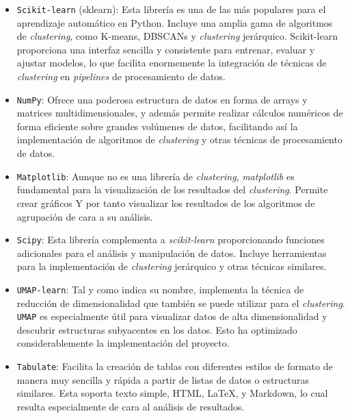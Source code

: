 \begin{itemize}
\item \texttt{Scikit-learn} (sklearn)\label{scikit}: Esta librería es una de las más populares para el aprendizaje automático en Python. Incluye una amplia gama de algoritmos de \textit{clustering}, como K-means, \glspl{DBSCAN} y \textit{clustering} jerárquico. Scikit-learn proporciona una interfaz sencilla y consistente para entrenar, evaluar y ajustar modelos, lo que facilita enormemente la integración de técnicas de \textit{clustering} en \textit{pipelines} de procesamiento de datos. \\
\item \texttt{NumPy}: Ofrece una poderosa estructura de datos en forma de arrays y matrices multidimensionales, y además permite realizar cálculos numéricos de forma eficiente sobre grandes volúmenes de datos, facilitando así la implementación de algoritmos de \textit{clustering} y otras técnicas de procesamiento de datos. \\
\item \texttt{Matplotlib}: Aunque no es una librería de \textit{clustering}, \textit{matplotlib} es fundamental para la visualización de los resultados del \textit{clustering}. Permite crear gráficos Y por tanto visualizar los resultados de los algoritmos de agrupación de cara a su análisis. \\
\item \texttt{Scipy}: Esta librería complementa a \textit{scikit-learn} proporcionando funciones adicionales para el análisis y manipulación de datos. Incluye herramientas para la implementación de \textit{clustering} jerárquico y otras técnicas similares. \\
\item \texttt{\gls{UMAP}-learn}: Tal y como indica su nombre, implementa la técnica de reducción de dimensionalidad que también se puede utilizar para el \textit{clustering}. \texttt{\gls{UMAP}} es especialmente útil para visualizar datos de alta dimensionalidad y descubrir estructuras subyacentes en los datos. Esto ha optimizado considerablemente la implementación del proyecto.  \\
\item \texttt{Tabulate}: Facilita la creación de tablas con diferentes estilos de formato de manera muy sencilla y rápida a partir de listas de datos o estructuras similares. Esta soporta texto simple, \gls{HTML}, LaTeX, y Markdown, lo cual resulta especialmente de cara al análisis de resultados.
\end{itemize}

